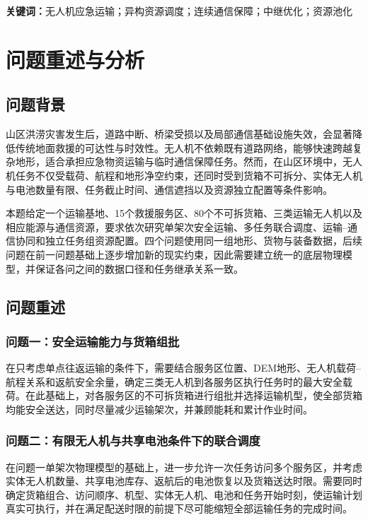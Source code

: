 \documentclass[UTF8,a4paper,12pt]{ctexart}
\begin{document}
\noindent\textbf{关键词：}无人机应急运输；异构资源调度；连续通信保障；中继优化；资源池化


\tableofcontents
\newpage


\section{问题重述与分析}
\label{sec:problem_analysis}

\subsection{问题背景}

山区洪涝灾害发生后，道路中断、桥梁受损以及局部通信基础设施失效，会显著降低传统地面救援的可达性与时效性。无人机不依赖既有道路网络，能够快速跨越复杂地形，适合承担应急物资运输与临时通信保障任务。然而，在山区环境中，无人机任务不仅受载荷、航程和地形净空约束，还同时受到货箱不可拆分、实体无人机与电池数量有限、任务截止时间、通信遮挡以及资源独立配置等条件影响。

本题给定一个运输基地、15个救援服务区、80个不可拆货箱、三类运输无人机以及相应能源与通信资源，要求依次研究单架次安全运输、多任务联合调度、运输--通信协同和独立任务组资源配置。四个问题使用同一组地形、货物与装备数据，后续问题在前一问题基础上逐步增加新的现实约束，因此需要建立统一的底层物理模型，并保证各问之间的数据口径和任务继承关系一致。

\subsection{问题重述}

\subsubsection{问题一：安全运输能力与货箱组批}

在只考虑单点往返运输的条件下，需要结合服务区位置、DEM地形、无人机载荷--航程关系和返航安全余量，确定三类无人机到各服务区执行任务时的最大安全载荷。在此基础上，对各服务区的不可拆货箱进行组批并选择运输机型，使全部货箱均能安全送达，同时尽量减少运输架次，并兼顾能耗和累计作业时间。

\subsubsection{问题二：有限无人机与共享电池条件下的联合调度}

在问题一单架次物理模型的基础上，进一步允许一次任务访问多个服务区，并考虑实体无人机数量、共享电池库存、返航后的电池恢复以及货箱送达时限。需要同时确定货箱组合、访问顺序、机型、实体无人机、电池和任务开始时刻，使运输计划真实可执行，并在满足配送时限的前提下尽可能缩短全部运输任务的完成时间。
\end{document}
